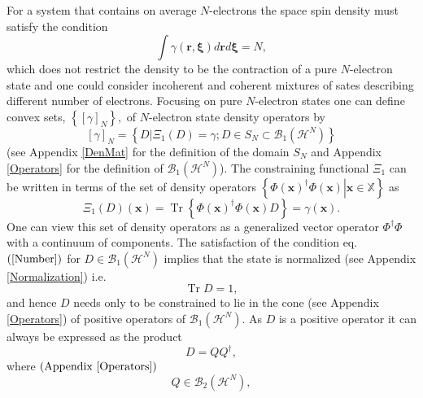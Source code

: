 \documentclass[aps,preprint]{revtex4}%
\begin{document}
For a system that contains on average $N$-electrons the space spin density
must satisfy the condition
\begin{equation}
\int\gamma\left(  \mathbf{r,\xi}\right)  d\mathbf{r}d\mathbf{\xi}=N,
\label{Number}%
\end{equation}
which does not restrict the density to be the contraction of a pure
$N$-electron state and one could consider incoherent and coherent mixtures of
sates describing different number of electrons. Focusing on pure $N$-electron
states one can define convex sets, $\left\{  \left[  \gamma\right]
_{N}\right\}  ,$ of $N$-electron state density operators by
\begin{equation}
\left[  \gamma\right]  _{N}=\left\{  \left.  D\right\vert \Xi_{1}\left(
D\right)  =\gamma;D\in S_{N}\subset\mathcal{B}_{1}\left(  \mathcal{H}%
^{N}\right)  \right\}
\end{equation}
(see Appendix \ref{DenMat} for the definition of the domain $S_{N}$ and
Appendix \ref{Operators} for the definition of $\mathcal{B}_{1}\left(
\mathcal{H}^{N}\right)  $). The constraining functional $\Xi_{1}$ can be
written in terms of the set of density operators $\left\{  \left.  \Phi\left(
\mathbf{x}\right)  ^{\dagger}\Phi\left(  \mathbf{x}\right)  \right\vert
\mathbf{x\in}\mathbb{X}\right\}  $ as
\begin{equation}
\Xi_{1}\left(  D\right)  \left(  \mathbf{x}\right)  =\operatorname{Tr}\left\{
\Phi\left(  \mathbf{x}\right)  ^{\dagger}\Phi\left(  \mathbf{x}\right)
D\right\}  =\gamma\left(  \mathbf{x}\right)  .
\end{equation}
One can view this set of density operators as a generalized vector operator
$\Phi^{\dagger}\Phi\mathbf{\ }$with a continuum of components. The
satisfaction of the condition eq. $\left(  \ref{Number}\right)  $ for
$D\in\mathcal{B}_{1}\left(  \mathcal{H}^{N}\right)  $ implies that the state
is normalized (see Appendix \ref{Normalization}) i.e.
\begin{equation}
\operatorname{Tr}D=1,
\end{equation}
and hence $D$ needs only to be constrained to lie in the cone (see Appendix
\ref{Operators}) of positive operators of $\mathcal{B}_{1}\left(
\mathcal{H}^{N}\right)  $. As $D$ is a positive operator it can always be
expressed as the product
\begin{equation}
D=QQ^{\dagger},
\end{equation}
where $\left(  \text{Appendix \ref{Operators}}\right)  $
\begin{equation}
Q\in\mathcal{B}_{2}\left(  \mathcal{H}^{N}\right)  ,
\end{equation}
\end{document}
